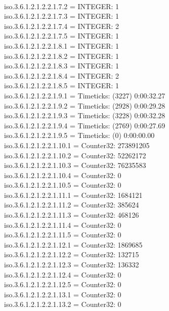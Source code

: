 \documentclass[a4paper,titlepage]{article}
\begin{document}
\begin{center}
{\\iso.3.6.1.2.1.2.2.1.7.2 = INTEGER: 1
\\iso.3.6.1.2.1.2.2.1.7.3 = INTEGER: 1
\\iso.3.6.1.2.1.2.2.1.7.4 = INTEGER: 2
\\iso.3.6.1.2.1.2.2.1.7.5 = INTEGER: 1
\\iso.3.6.1.2.1.2.2.1.8.1 = INTEGER: 1
\\iso.3.6.1.2.1.2.2.1.8.2 = INTEGER: 1
\\iso.3.6.1.2.1.2.2.1.8.3 = INTEGER: 1
\\iso.3.6.1.2.1.2.2.1.8.4 = INTEGER: 2
\\iso.3.6.1.2.1.2.2.1.8.5 = INTEGER: 1
\\iso.3.6.1.2.1.2.2.1.9.1 = Timeticks: (3227) 0:00:32.27
\\iso.3.6.1.2.1.2.2.1.9.2 = Timeticks: (2928) 0:00:29.28
\\iso.3.6.1.2.1.2.2.1.9.3 = Timeticks: (3228) 0:00:32.28
\\iso.3.6.1.2.1.2.2.1.9.4 = Timeticks: (2769) 0:00:27.69
\\iso.3.6.1.2.1.2.2.1.9.5 = Timeticks: (0) 0:00:00.00
\\iso.3.6.1.2.1.2.2.1.10.1 = Counter32: 273891205
\\iso.3.6.1.2.1.2.2.1.10.2 = Counter32: 52262172
\\iso.3.6.1.2.1.2.2.1.10.3 = Counter32: 76235583
\\iso.3.6.1.2.1.2.2.1.10.4 = Counter32: 0
\\iso.3.6.1.2.1.2.2.1.10.5 = Counter32: 0
\\iso.3.6.1.2.1.2.2.1.11.1 = Counter32: 1684121
\\iso.3.6.1.2.1.2.2.1.11.2 = Counter32: 385624
\\iso.3.6.1.2.1.2.2.1.11.3 = Counter32: 468126
\\iso.3.6.1.2.1.2.2.1.11.4 = Counter32: 0
\\iso.3.6.1.2.1.2.2.1.11.5 = Counter32: 0
\\iso.3.6.1.2.1.2.2.1.12.1 = Counter32: 1869685
\\iso.3.6.1.2.1.2.2.1.12.2 = Counter32: 132715
\\iso.3.6.1.2.1.2.2.1.12.3 = Counter32: 136332
\\iso.3.6.1.2.1.2.2.1.12.4 = Counter32: 0
\\iso.3.6.1.2.1.2.2.1.12.5 = Counter32: 0
\\iso.3.6.1.2.1.2.2.1.13.1 = Counter32: 0
\\iso.3.6.1.2.1.2.2.1.13.2 = Counter32: 0
}
\end{center}
\end{document}
